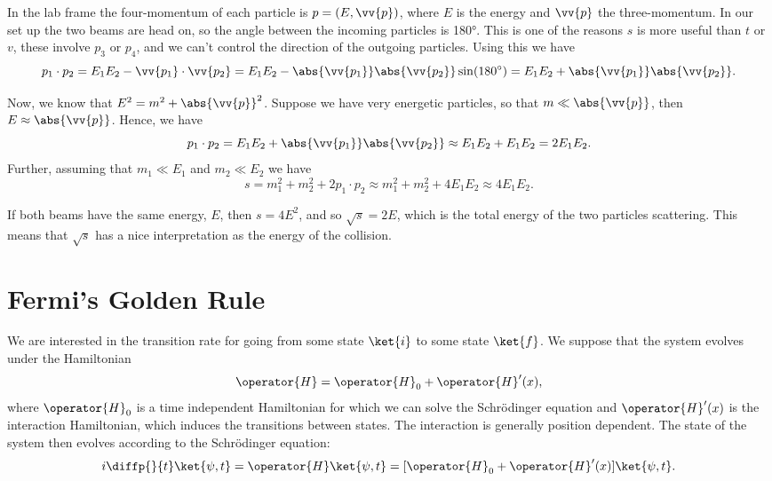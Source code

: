 \documentclass[fleqn]{NotesClass}
\begin{document}
    In the lab frame the four-momentum of each particle is \(p = (E, \vv{p})\), where \(E\) is the energy and \(\vv{p}\) the three-momentum.
    In our set up the two beams are head on, so the angle between the incoming particles is \ang{180}.
    This is one of the reasons \(s\) is more useful than \(t\) or \(v\), these involve \(p_3\) or \(p_4\), and we can't control the direction of the outgoing particles.
    Using this we have
    \begin{equation}
        p_1 \cdot p_2 = E_1E_2 - \vv{p_1}\cdot \vv{p_2} = E_1E_2 - \abs{\vv{p_1}}\abs{\vv{p_2}}\sin(\ang{180}) = E_1E_2 + \abs{\vv{p_1}}\abs{\vv{p_2}}.
    \end{equation}
    
    Now, we know that \(E^2 = m^2 + \abs{\vv{p}}^2\).
    Suppose we have very energetic particles, so that \(m \ll \abs{\vv{p}}\), then \(E \approx \abs{\vv{p}}\).
    Hence, we have
    \begin{equation}
        p_1 \cdot p_2 = E_1E_2 + \abs{\vv{p_1}}\abs{\vv{p_2}} \approx E_1 E_2 + E_1E_2 = 2E_1E_2.
    \end{equation}
    Further, assuming that \(m_1 \ll E_1\) and \(m_2 \ll E_2\) we have
    \begin{equation}
        s = m_1^2 + m_2^2 + 2p_1 \cdot p_2 \approx m_1^2 + m_2^2 + 4E_1E_2 \approx 4E_1E_2.
    \end{equation}
    
    If both beams have the same energy, \(E\), then \(s = 4E^2\), and so \(\sqrt{s} = 2E\), which is the total energy of the two particles scattering.
    This means that \(\sqrt{s}\) has a nice interpretation as the energy of the collision.
    
    \section{Fermi's Golden Rule}
    We are interested in the transition rate for going from some state \(\ket{i}\) to some state \(\ket{f}\).
    We suppose that the system evolves under the Hamiltonian
    \begin{equation}
        \operator{H} = \operator{H}_0 + \operator{H}'(x),
    \end{equation}
    where \(\operator{H}_0\) is a time independent Hamiltonian for which we can solve the Schrödinger equation and \(\operator{H}'(x)\) is the interaction Hamiltonian, which induces the transitions between states.
    The interaction is generally position dependent.
    The state of the system then evolves according to the Schrödinger equation:
    \begin{equation}
        i \diffp{}{t}\ket{\psi, t} = \operator{H}\ket{\psi, t} = [\operator{H}_0 + \operator{H}'(x)]\ket{\psi, t}.
    \end{equation}
    
\end{document}
